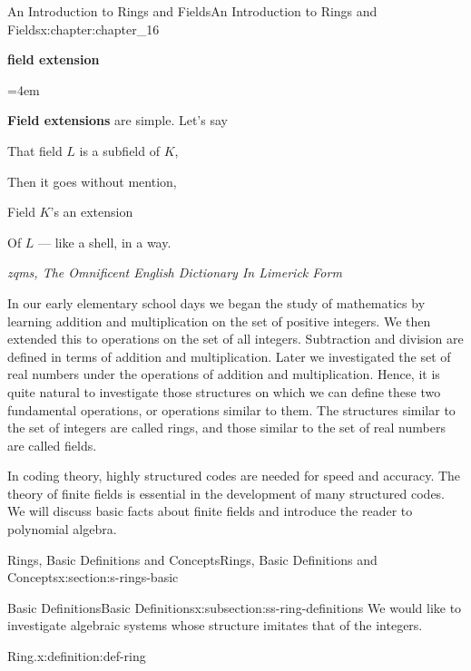 \documentclass[oneside,10pt,]{book}
\newcommand{\terminology}[1]{\textbf{#1}}
\numberwithin{equation}{section}
\newenvironment{poem}{\setlength{\parindent}{0em}}{}
\newcommand{\poemTitle}[1]{\begin{center}\large\textbf{#1}\end{center}}
\newenvironment{stanza}{\vspace{0.25 em}\hangindent=4em}{\vspace{1 em}}
\newcommand{\poemauthorleft}[1]{\vspace{-1em}\begin{flushleft}\textit{#1}\end{flushleft}}
\newcommand{\poemlineleft}[1]{{\raggedright{#1}\par}\vspace{-\parskip}}
\begin{document}
\begin{chapterptx}{An Introduction to Rings and Fields}{}{An Introduction to Rings and Fields}{}{}{x:chapter:chapter_16}
\begin{introduction}{}%
\begin{poem}%
\poemTitle{field extension}
\begin{stanza}
\poemlineleft{\terminology{Field extensions} are simple. Let's say}
\poemlineleft{That field \(L\) is a subfield of \(K\),}
\poemlineleft{Then it goes without mention,}
\poemlineleft{Field \(K\)'s an extension}
\poemlineleft{Of \(L\) — like a shell, in a way.}
\end{stanza}
\poemauthorleft{zqms, The Omnificent English Dictionary In Limerick Form}
\end{poem}
In our early elementary school days we began the study of mathematics by learning addition and multiplication on the set of positive integers. We then extended this to operations on the set of all integers. Subtraction and division are defined in terms of addition and multiplication. Later we investigated the set of real numbers under the operations of addition and multiplication. Hence, it is quite natural to investigate those structures on which we can define these two fundamental operations, or operations similar to them. The structures similar to the set of integers are called rings, and those similar to the set of real numbers are called fields.%
\par
In coding theory, highly structured codes are needed for speed and accuracy. The theory of finite fields is essential in the development of many structured codes. We will discuss basic facts about finite fields and introduce the reader to polynomial algebra.%
\end{introduction}%
%
%
\typeout{************************************************}
\typeout{************************************************}
%
\begin{sectionptx}{Rings, Basic Definitions and Concepts}{}{Rings, Basic Definitions and Concepts}{}{}{x:section:s-rings-basic}
%
%
\typeout{************************************************}
\typeout{************************************************}
%
\begin{subsectionptx}{Basic Definitions}{}{Basic Definitions}{}{}{x:subsection:ss-ring-definitions}
We would like to investigate algebraic systems whose structure imitates that of the integers.%
\begin{definition}{Ring.}{x:definition:def-ring}%

\end{definition}
\end{subsectionptx}
\end{sectionptx}
\end{chapterptx}
\end{document}
